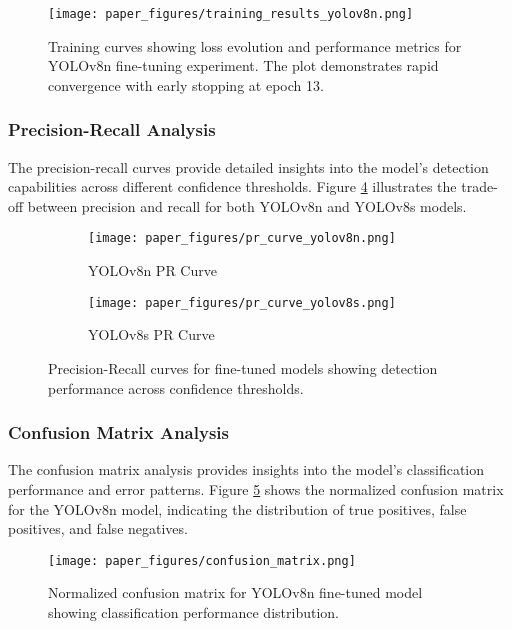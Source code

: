 \documentclass[12pt,a4paper]{article}
\begin{document}
\begin{figure}[H]
\centering
\texttt{[image: paper\_figures/training\_results\_yolov8n.png]}
\caption{Training curves showing loss evolution and performance metrics for YOLOv8n fine-tuning experiment. The plot demonstrates rapid convergence with early stopping at epoch 13.}
\label{fig:training_results}
\end{figure}

\subsubsection{Precision-Recall Analysis}
The precision-recall curves provide detailed insights into the model's detection capabilities across different confidence thresholds. Figure \ref{fig:pr_curves} illustrates the trade-off between precision and recall for both YOLOv8n and YOLOv8s models.

\begin{figure}[H]
\centering
\begin{subfigure}[b]{0.48\textwidth}
    \texttt{[image: paper\_figures/pr\_curve\_yolov8n.png]}
    \caption{YOLOv8n PR Curve}
    \label{fig:pr_curve_yolov8n}
\end{subfigure}
\hfill
\begin{subfigure}[b]{0.48\textwidth}
    \texttt{[image: paper\_figures/pr\_curve\_yolov8s.png]}
    \caption{YOLOv8s PR Curve}
    \label{fig:pr_curve_yolov8s}
\end{subfigure}
\caption{Precision-Recall curves for fine-tuned models showing detection performance across confidence thresholds.}
\label{fig:pr_curves}
\end{figure}

\subsubsection{Confusion Matrix Analysis}
The confusion matrix analysis provides insights into the model's classification performance and error patterns. Figure \ref{fig:confusion_matrix} shows the normalized confusion matrix for the YOLOv8n model, indicating the distribution of true positives, false positives, and false negatives.

\begin{figure}[H]
\centering
\texttt{[image: paper\_figures/confusion\_matrix.png]}
\caption{Normalized confusion matrix for YOLOv8n fine-tuned model showing classification performance distribution.}
\label{fig:confusion_matrix}
\end{figure}
\end{document}
